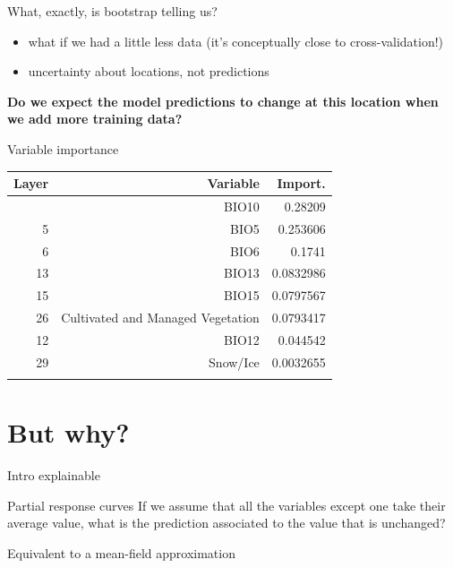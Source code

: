 \documentclass[12pt, smalloffset, compress, aspectratio=1610]{beamer}
\providecommand{\tightlist}{%
  \setlength{\itemsep}{0pt}\setlength{\parskip}{0pt}}
\begin{document}
\begin{frame}{What, exactly, is bootstrap telling us?}
\label{what-exactly-is-bootstrap-telling-us}
\begin{itemize}
\tightlist
\item
  what if we had a little less data (it's conceptually close to
  cross-validation!)
\item
  uncertainty about locations, not predictions
\end{itemize}

\textbf{Do we expect the model predictions to change at this location
when we add more training data?}
\end{frame}

\begin{frame}{Variable importance}
\label{variable-importance}
\begin{longtable}[]{@{}rrr@{}}
\toprule\noalign{}
\textbf{Layer} & \textbf{Variable} & \textbf{Import.} \\
\midrule\noalign{}
\endhead
10 & BIO10 & 0.28209 \\
5 & BIO5 & 0.253606 \\
6 & BIO6 & 0.1741 \\
13 & BIO13 & 0.0832986 \\
15 & BIO15 & 0.0797567 \\
26 & Cultivated and Managed Vegetation & 0.0793417 \\
12 & BIO12 & 0.044542 \\
29 & Snow/Ice & 0.0032655 \\
\bottomrule\noalign{}
\end{longtable}
\end{frame}

\section{But why?}\label{but-why-1}

\begin{frame}{Intro explainable}
\label{intro-explainable}
\end{frame}

\begin{frame}{Partial response curves}
\label{partial-response-curves}
If we assume that all the variables except one take their average value,
what is the prediction associated to the value that is unchanged?

Equivalent to a mean-field approximation
\end{frame}
\end{document}
